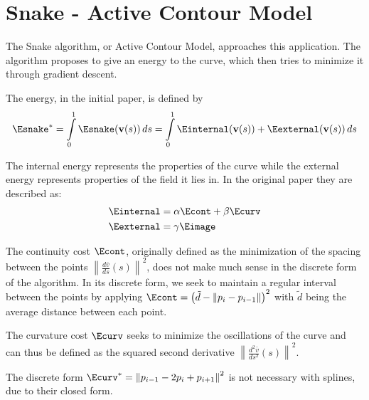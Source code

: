 \chapter{Snake - Active Contour Model}


The Snake algorithm, or Active Contour Model, approaches this application. The algorithm proposes to give an energy to the curve, which then tries to minimize it through gradient descent.

The energy, in the initial paper, is defined by
\begin{align}
    \Esnake^{*} = \int \limits _{0}^{1} { \Esnake(\mathbf {v} (s))\,ds } = \int \limits _{0}^{1} { \Einternal (\mathbf {v} (s)) + \Eexternal (\mathbf {v} (s)) } \,ds
\end{align}

The internal energy represents the properties of the curve while the external energy represents properties of the field it lies in. In the original paper they are described as: 
\begin{align}
    \Einternal &= \alpha \Econt + \beta \Ecurv \\
    \Eexternal &= \gamma \Eimage
\end{align}

The continuity cost $\Econt$, originally defined as the minimization of the spacing between the points $\left\|{\frac {d{\bar {v}}}{ds}}(s)\right\| ^{2}$, does not make much sense in the discrete form of the algorithm. In its discrete form, we seek to maintain a regular interval between the points by applying $\Econt = \left(\tilde{d} - \left\|p_i - p_{i-1} \right\| \right)^2$ with $\tilde{d}$ being the average distance between each point.

The curvature cost $\Ecurv$ seeks to minimize the oscillations of the curve and can thus be defined as the squared second derivative $\left\|{\frac {d^{2}{\bar {v}}}{ds^{2}}}(s)\right\| ^{2}$.

The discrete form $\Ecurv^{*} = \left\| p_{i-1} - 2 p_i + p_{i+1} \right\| ^2$ is not necessary with splines, due to their closed form.

